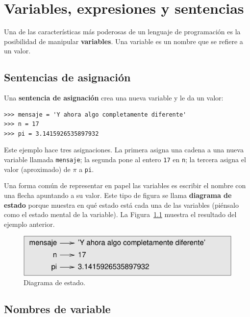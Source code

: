 \documentclass[10pt]{book}
\begin{document}
\chapter{Variables, expresiones y sentencias}

Una de las características más poderosas de un lenguaje de programación es la
posibilidad de manipular {\bf variables}.  Una variable es un nombre que
se refiere a un valor.


\section{Sentencias de asignación}
\label{variables}

Una {\bf sentencia de asignación} crea una nueva variable y le da
un valor:

\begin{verbatim}
>>> mensaje = 'Y ahora algo completamente diferente'
>>> n = 17
>>> pi = 3.1415926535897932
\end{verbatim}
%
Este ejemplo hace tres asignaciones.  La primera asigna una cadena
a una nueva variable llamada {\tt mensaje};
la segunda pone al entero {\tt 17} en {\tt n}; la tercera
asigna el valor (aproximado) de $\pi$ a {\tt pi}.

Una forma común de representar en papel las variables es escribir el nombre con
una flecha apuntando a su valor.  Este tipo de figura se
llama {\bf diagrama de estado} porque muestra en qué estado está cada una
de las variables (piénsalo como el estado mental de la variable).
La Figura~\ref{fig.state2} muestra el resultado del ejemplo anterior.

\begin{figure}
\centerline
{\includegraphics[scale=0.8]{figs/state2.pdf}}
\caption{Diagrama de estado.}
\label{fig.state2}
\end{figure}



\section{Nombres de variable}
\end{document}
